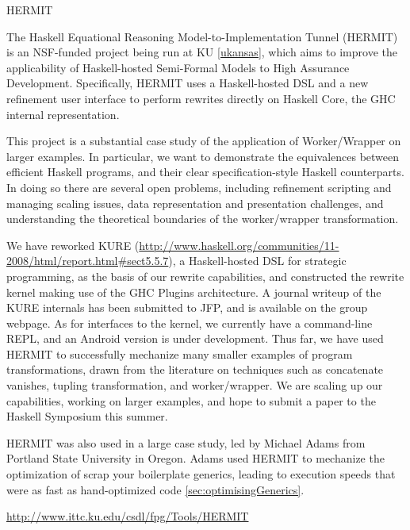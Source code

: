 \begin{hcarentry}[updated]{HERMIT}
\label{HERMIT}
\makeheader

The Haskell Equational Reasoning Model-to-Implementation Tunnel
(HERMIT) is an NSF-funded project being run at KU \cref{ukansas}, which aims to improve the
applicability of Haskell-hosted Semi-Formal Models to High Assurance Development.
Specifically, HERMIT uses a Haskell-hosted DSL
and a new refinement user interface to perform rewrites directly on Haskell Core, the GHC internal representation.

This project is a substantial case study of the application of
Worker/Wrapper on larger examples. In particular, we want to
demonstrate the equivalences between efficient Haskell programs, and
their clear specification-style Haskell counterparts. In doing so
there are several open problems, including refinement scripting and
managing scaling issues, data representation and presentation
challenges, and understanding the theoretical boundaries of the
worker/wrapper transformation.

We have reworked KURE (\url{http://www.haskell.org/communities/11-2008/html/report.html#sect5.5.7}),
a Haskell-hosted DSL for strategic programming, as the basis of our rewrite capabilities,
and constructed the rewrite kernel making use of the GHC Plugins architecture.
A journal writeup of the KURE internals has been submitted to JFP, and is available
on the group webpage.
As for interfaces to the kernel, 
we currently have a command-line REPL, and an Android version is under development.
Thus far, we have used HERMIT to successfully mechanize many smaller examples of program transformations,
drawn from the literature on techniques such as concatenate vanishes, tupling transformation, and worker/wrapper.
We are scaling up our capabilities, working on larger examples, and hope to submit a paper
to the Haskell Symposium this summer.

HERMIT was also used in a large case study, led by Michael Adams from Portland State University
in Oregon. Adams used HERMIT to mechanize the optimization of scrap your boilerplate generics,
leading to execution speeds that were as fast as hand-optimized code \cref{sec:optimisingGenerics}.

\FurtherReading
  \url{http://www.ittc.ku.edu/csdl/fpg/Tools/HERMIT}
\end{hcarentry}

